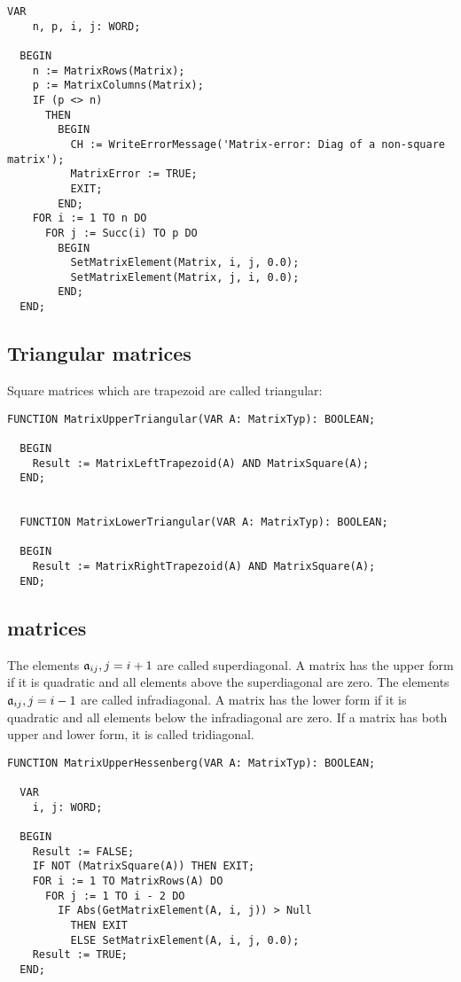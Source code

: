 \begin{refsection}
\begin{lstlisting}[caption=set all of-diagonal elements to zero]
  VAR
    n, p, i, j: WORD;

  BEGIN
    n := MatrixRows(Matrix);
    p := MatrixColumns(Matrix);
    IF (p <> n)
      THEN
        BEGIN
          CH := WriteErrorMessage('Matrix-error: Diag of a non-square matrix');
          MatrixError := TRUE;
          EXIT;
        END;
    FOR i := 1 TO n DO
      FOR j := Succ(i) TO p DO
        BEGIN
          SetMatrixElement(Matrix, i, j, 0.0);
          SetMatrixElement(Matrix, j, i, 0.0);
        END;
  END;
\end{lstlisting}

\subsection{Triangular matrices}

Square matrices which are trapezoid are called triangular:

\begin{lstlisting}[caption=is matrix triangular?]
  FUNCTION MatrixUpperTriangular(VAR A: MatrixTyp): BOOLEAN;

  BEGIN
    Result := MatrixLeftTrapezoid(A) AND MatrixSquare(A);
  END;


  FUNCTION MatrixLowerTriangular(VAR A: MatrixTyp): BOOLEAN;

  BEGIN
    Result := MatrixRightTrapezoid(A) AND MatrixSquare(A);
  END;
\end{lstlisting}

\subsection{ matrices}

The elements \(\mathfrak{a}_{ij}, j = i+1 \) are called superdiagonal. A matrix has the upper  form if it is quadratic and all elements above the superdiagonal are zero. The elements \(\mathfrak{a}_{ij}, j = i-1 \) are called infradiagonal. A matrix has the lower  form if it is quadratic and all elements below the infradiagonal are zero. If a matrix has both upper and lower  form, it is called tridiagonal.


\begin{lstlisting}[caption=has matrix the upper Hessenberg form?]
  FUNCTION MatrixUpperHessenberg(VAR A: MatrixTyp): BOOLEAN;

  VAR
    i, j: WORD;

  BEGIN
    Result := FALSE;
    IF NOT (MatrixSquare(A)) THEN EXIT;
    FOR i := 1 TO MatrixRows(A) DO
      FOR j := 1 TO i - 2 DO
        IF Abs(GetMatrixElement(A, i, j)) > Null
          THEN EXIT
          ELSE SetMatrixElement(A, i, j, 0.0);
    Result := TRUE;
  END;



\end{lstlisting}
\end{refsection}
